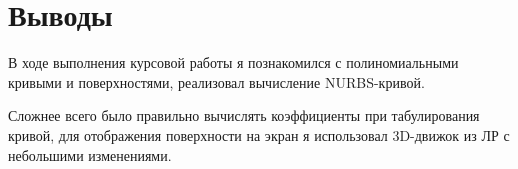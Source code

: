 \section{Выводы}
В ходе выполнения курсовой работы я познакомился с полиномиальными кривыми и поверхностями, реализовал вычисление NURBS-кривой.

Сложнее всего было правильно вычислять коэффициенты при табулирования кривой, для отображения поверхности на экран я использовал 3D-движок из ЛР с небольшими изменениями.
\pagebreak
